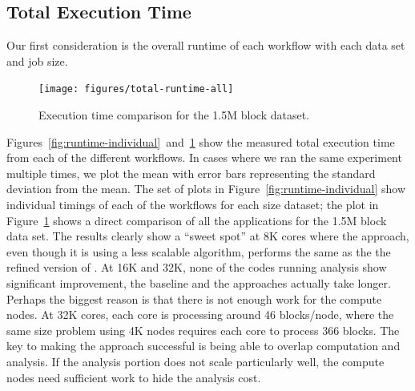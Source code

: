 

\subsection{Total Execution Time}
\label{sec:TotalExecutionTime}

Our first consideration is the overall runtime of each workflow with each
data set and job size.

\begin{figure}[tbp]
\begin{centering}
\texttt{[image: figures/total-runtime-all]}
\caption{Execution time comparison for the 1.5M block dataset.}
\label{fig:runtime-total}
\par\end{centering}
\end{figure}

Figures~\ref{fig:runtime-individual}~and~\ref{fig:runtime-total} show the
measured total execution time from each of the different workflows.  In cases
where we ran the same experiment multiple times, we plot the mean with error
bars representing the standard deviation from the mean. The set of plots in
Figure~\ref{fig:runtime-individual} show individual timings of each of the
workflows for each size dataset; the plot  in Figure~\ref{fig:runtime-total}
shows a direct comparison of all the  applications for the 1.5M block data set.
The results clearly show a ``sweet spot'' at 8K cores where the \intransit
approach, even though it is using a less scalable algorithm, performs the same
as the the refined version of \insitu.  At 16K and 32K, none of the codes
running analysis show significant improvement, the baseline \insitu and the
\intransit approaches actually take longer.  Perhaps the biggest reason is that
there is not enough work for the compute nodes.  At 32K cores, each core is
processing around 46 blocks/node, where the same size problem using 4K
nodes requires each core to process 366 blocks.  The key to making the
\intransit approach successful is being able to overlap computation and
analysis.  If the analysis portion does not scale particularly well, the
compute nodes need sufficient work to hide the analysis cost.


